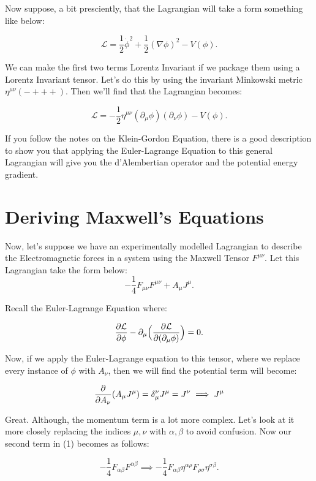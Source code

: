 \documentclass{article}
\newcommand{\lagr}{\mathcal{L}}
\newcommand{\mink}{\eta^{\mu\nu}}
\newcommand{\cvd}[1]{\partial_{#1}}
\newcommand{\pmu}[1]{\partial_{#1}}
\begin{document}
Now suppose, a bit presciently, that the Lagrangian will take a form something like below:

\[
    \lagr = \frac{1}{2} \dot{\phi}^2 + \frac{1}{2} (\nabla \phi)^2 - V(\phi)
.\] 

We can make the first two terms Lorentz Invariant if we package them using a Lorentz Invariant tensor. Let's do this by using the invariant Minkowski metric $\mink (-+++)$. Then we'll find that the Lagrangian becomes:

\[
    \lagr = -\frac{1}{2} \mink (\cvd{\mu}\phi) (\cvd{\nu}\phi) - V(\phi)
.\] 

If you follow the notes on the Klein-Gordon Equation, there is a good description to show you that applying the Euler-Lagrange Equation to this general Lagrangian will give you the d'Alembertian operator and the potential energy gradient.

\section{Deriving Maxwell's Equations}
Now, let's suppose we have an experimentally modelled Lagrangian to describe the Electromagnetic forces in a system using the Maxwell Tensor $F^{\mu\nu}$. Let this Lagrangian take the form below:
\begin{equation}
    -\frac{1}{4} F_{\mu\nu} F^{\mu\nu} + A_{\mu} J^{\mu}.
\end{equation}

Recall the Euler-Lagrange Equation where:

\begin{equation}
    \pdv{\lagr}{\phi} - \pmu{\mu} \Big( \pdv{\lagr}{(\pmu{\mu}\phi)} \Big) = 0.
\end{equation}

Now, if we apply the Euler-Lagrange equation to this tensor, where we replace every instance of $\phi$ with $A_{\nu}$, then we will find the potential term will become: 

\[
     \pdv{A_{\nu}} (A_{\mu}J^{\mu}) = \delta^{\nu}_{\mu} J^{\mu} = J^{\nu} \implies J^{\mu}
\] 

Great. Although, the momentum term is a lot more complex. Let's look at it more closely replacing the indices $\mu, \nu$ with $\alpha, \beta$ to avoid confusion. Now our second term in (1) becomes as follows:

\[
    - \frac{1}{4} F_{\alpha \beta} F^{\alpha \beta} \implies - \frac{1}{4} F_{\alpha \beta} \eta^{\alpha \rho} F_{\rho \sigma} \eta^{\sigma \beta}
.\] 
\end{document}
